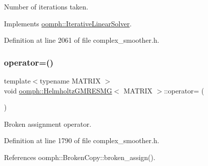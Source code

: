 Number of iterations taken. 



Implements \hyperlink{classoomph_1_1IterativeLinearSolver_a5fe7f7b5e4847fdbd4f95d3875ec7a46}{oomph\+::\+Iterative\+Linear\+Solver}.



Definition at line 2061 of file complex\+\_\+smoother.\+h.

\mbox{\label{classoomph_1_1HelmholtzGMRESMG_ae304723f85ff9f174b020969fdf66e60}} 
\subsubsection{\texorpdfstring{operator=()}{operator=()}}
{\footnotesize\ttfamily template$<$typename M\+A\+T\+R\+IX $>$ \\
void \hyperlink{classoomph_1_1HelmholtzGMRESMG}{oomph\+::\+Helmholtz\+G\+M\+R\+E\+S\+MG}$<$ M\+A\+T\+R\+IX $>$\+::operator= (\begin{DoxyParamCaption}\item[{const \hyperlink{classoomph_1_1HelmholtzGMRESMG}{Helmholtz\+G\+M\+R\+E\+S\+MG}$<$ M\+A\+T\+R\+IX $>$ \&}]{ }\end{DoxyParamCaption})\hspace{0.3cm}{\ttfamily [inline]}}



Broken assignment operator. 



Definition at line 1790 of file complex\+\_\+smoother.\+h.



References oomph\+::\+Broken\+Copy\+::broken\+\_\+assign().

\mbox{\label{classoomph_1_1HelmholtzGMRESMG_a6050720b0d12f422e4b2983378dc53e5}} 
